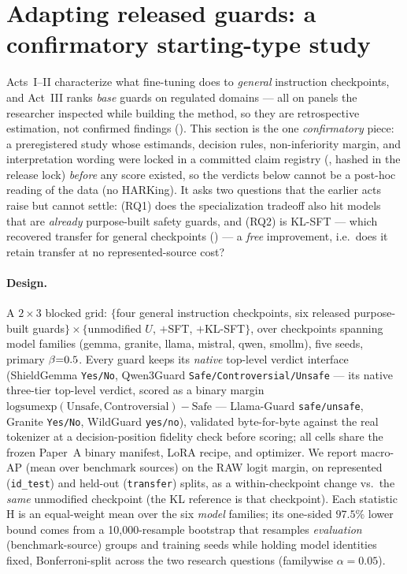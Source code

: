 \section{Adapting released guards: a confirmatory starting-type study}
\label{sec:adaptation}

Acts~I--II characterize what fine-tuning does to \emph{general} instruction checkpoints, and Act~III ranks
\emph{base} guards on regulated domains --- all on panels the researcher inspected while building the
method, so they are retrospective estimation, not confirmed findings (). This section is the one \emph{confirmatory} piece: a preregistered
study whose estimands, decision rules, non-inferiority margin, and interpretation wording were locked in
a committed claim registry (,
hashed in the release lock) \emph{before} any score existed, so the verdicts below cannot be a post-hoc
reading of the data (no HARKing). It asks two questions that the earlier acts raise but cannot settle:
(RQ1) does the specialization tradeoff also hit models that are \emph{already} purpose-built safety
guards, and (RQ2) is KL-SFT --- which recovered transfer for general checkpoints ()
--- a \emph{free} improvement, i.e.\ does it retain transfer at no represented-source cost?

\paragraph{Design.} A $2\times 3$ blocked grid: $\{$four general instruction checkpoints, six released
purpose-built guards$\}\times\{$unmodified $U$, $+$SFT, $+$KL-SFT$\}$, over \AdaNCheckpoints{}
checkpoints spanning \AdaNFamilies{} model families (gemma, granite, llama, mistral, qwen, smollm), five
seeds, primary $\beta{=}0.5$. Every guard keeps its \emph{native} top-level verdict
interface (ShieldGemma \texttt{Yes/No}, Qwen3Guard \texttt{Safe/Controversial/Unsafe} --- its native
three-tier top-level verdict, scored as a binary margin $\mathrm{logsumexp}(\text{Unsafe},\text{Controversial})-\text{Safe}$ --- Llama-Guard
\texttt{safe/unsafe}, Granite \texttt{Yes/No}, WildGuard \texttt{yes/no}), validated byte-for-byte
against the real tokenizer at a decision-position fidelity check before scoring; all cells share the
frozen Paper~A binary manifest, LoRA recipe, and optimizer. We report macro-AP (mean over benchmark
sources) on the RAW logit margin, on represented (\texttt{id\_test}) and held-out (\texttt{transfer})
splits, as a within-checkpoint change vs.\ the \emph{same} unmodified checkpoint (the KL reference is
that checkpoint). Each statistic H is an equal-weight mean over the six \emph{model} families; its
one-sided $97.5\%$ lower bound comes from a 10{,}000-resample bootstrap that resamples \emph{evaluation}
(benchmark-source) groups and training seeds while holding model identities fixed, Bonferroni-split
across the two research questions (familywise $\alpha=0.05$).

